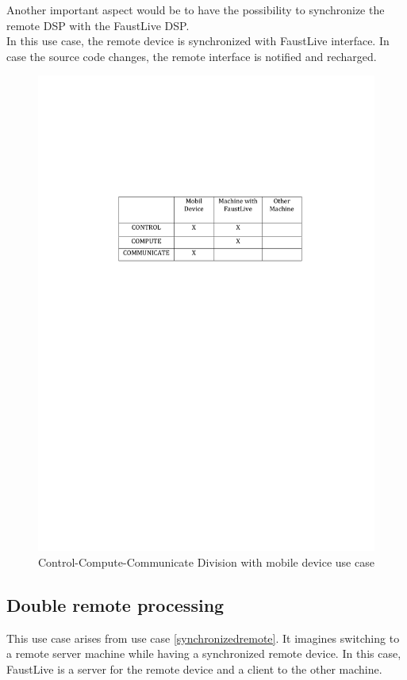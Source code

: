 \documentclass[a4paper]{article}
\begin{document}
Another important aspect would be to have the possibility to synchronize the remote DSP with the FaustLive DSP. \\

In this use case, the remote device is synchronized with FaustLive interface. In case the source code changes, the remote interface is notified and recharged. 

\begin{figure}[!h]
\begin{center}
\includegraphics[width=0.7\columnwidth]{images/61CCC}
\caption{Control-Compute-Communicate Division with mobile device use case}
\label{fig:6CCC}
\end{center}
\end{figure}

\newpage
\subsection{ Double remote processing}\label{doubleprocessing}

This use case arises from use case \ref{synchronizedremote}. It imagines switching to a remote server machine while having a synchronized remote device. In this case, FaustLive is a server for the remote device and a client to the other machine.
\end{document}
